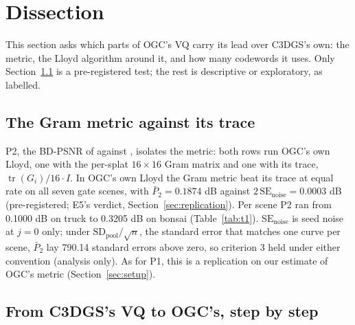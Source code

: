 \section{Dissection}
\label{sec:dissection}

This section asks which parts of OGC's VQ carry its lead over C3DGS's own: the metric, the Lloyd algorithm around it, and how many codewords it uses. %
Only Section~\ref{sec:gram-trace} is a pre-registered test; the rest is descriptive or exploratory, as labelled. %

\subsection{The Gram metric against its trace}
\label{sec:gram-trace}

P2, the BD-PSNR of  against , isolates the metric: both rows run OGC's own Lloyd, one with the per-splat $16\times16$ Gram matrix and one with its trace, $\operatorname{tr}(G_i)/16\cdot I$. %
In OGC's own Lloyd the Gram metric beat its trace at equal rate on all seven gate scenes, with $\bar P_2 = 0.1874$ dB against $2\,\mathrm{SE}_{\mathrm{noise}} = 0.0003$ dB (pre-registered; E5's verdict, Section~\ref{sec:replication}). %
Per scene P2 ran from 0.1000 dB on truck to 0.3205 dB on bonsai (Table~\ref{tab:t1}). %
$\mathrm{SE}_{\mathrm{noise}}$ is seed noise at $j = 0$ only; under $\mathrm{SD}_{\mathrm{pool}}/\sqrt{n}$, the standard error that matches one curve per scene, $\bar P_2$ lay 790.14 standard errors above zero, so criterion 3 held under either convention (analysis only). %
As for P1, this is a replication on our estimate of OGC's metric (Section~\ref{sec:setup}). %

\subsection{From C3DGS's VQ to OGC's, step by step}
\label{sec:steps}

